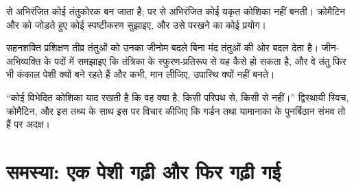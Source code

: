 \begin{exercise}[$\star\star\star$]\label{exo:b2:cell-differentiation:10}
 से अभिरंजित कोई तंतुकोरक  बन जाता है; पर  से
अभिरंजित कोई यकृत कोशिका नहीं बनती। क्रोमैटिन और  को
जोड़ते हुए कोई स्पष्टीकरण सुझाइए, और उसे परखने का कोई प्रयोग।
\end{exercise}

\begin{exercise}[$\star\star\star$]\label{exo:b2:cell-differentiation:11}
सहनशक्ति प्रशिक्षण तीव्र तंतुओं को उनका जीनोम बदले बिना मंद तंतुओं की
ओर बदल देता है। जीन-अभिव्यक्ति के पदों में समझाइए कि तंत्रिका के
स्फुरण-प्रतिरूप से यह कैसे हो सकता है, और वे तंतु फिर भी कंकाल पेशी क्यों
बने रहते हैं और कभी, मान लीजिए, उपास्थि क्यों नहीं बनते।
\end{exercise}

\begin{exercise}[$\star\star\star$]\label{exo:b2:cell-differentiation:12}
``कोई विभेदित कोशिका याद रखती है कि वह क्या है, किसी परिपथ से, किसी
 से नहीं।'' द्विस्थायी स्विच, क्रोमैटिन, और इस तथ्य के साथ
इस पर विचार कीजिए कि गर्डन तथा यामानाका के पुनर्बिठान संभव तो हैं पर
अदक्ष।
\end{exercise}

\section{समस्या: एक पेशी गढ़ी और फिर गढ़ी गई}

